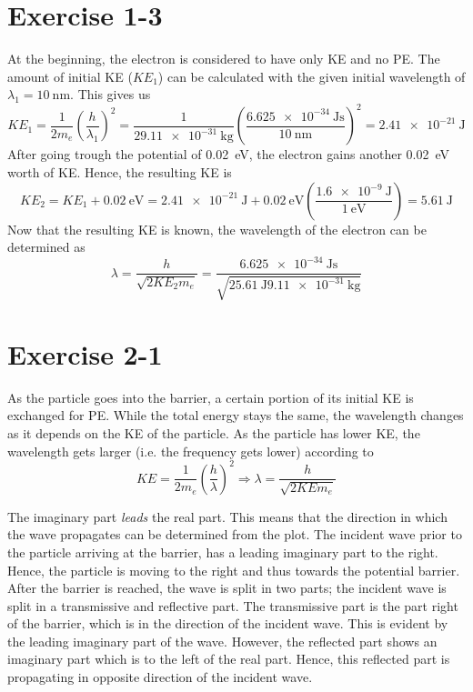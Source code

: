 \section{Exercise 1-3}
At the beginning, the electron is considered to have only KE and no PE. The
amount of initial KE ($KE_1$) can be calculated with the given initial
wavelength of $\lambda_1 = \SI{10}{\nano\meter}$. This gives us
\[
	KE_1
	= \frac{1}{2 m_e} \left(\frac{h}{\lambda_1}\right)^2
	= \frac{1}{2 \SI{9.11e-31}{\kg}} \left(\frac{\SI{6.625e-34}{\joule\second}}{\SI{10}{\nano\meter}}\right)^2
	= \SI{2.41e-21}{\joule}
\]
After going trough the potential of \SI{0.02}{\eV}, the electron gains
another \SI{0.02}{\eV} worth of KE. Hence, the resulting KE is
\[
	KE_2
	= KE_1 + \SI{0.02}{\eV}
	= \SI{2.41e-21}{\joule} + \SI{0.02}{\eV}\left(\frac{\SI{1.6e-9}{\joule}}{\SI{1}{\eV}}\right)
	= \SI{5.61}{\joule}
\]
Now that the resulting KE is known, the wavelength of the electron can be
determined as
\[
	\lambda
	= \frac{h}{\sqrt{2 KE_2 m_e}}
	= \frac{\SI{6.625e-34}{\joule\second}}{\sqrt{2 \SI{5.61}{\joule} \SI{9.11e-31}{\kg}}}
\]



\newpage
\section{Exercise 2-1}
As the particle goes into the barrier, a certain portion of its initial KE
is exchanged for PE. While the total energy stays the same, the wavelength
changes as it depends on the KE of the particle. As the particle has lower
KE, the wavelength gets larger (i.e. the frequency gets lower) according to
\[
	KE = \frac{1}{2 m_e} \left(\frac{h}{\lambda}\right)^2
	\Rightarrow
	\lambda = \frac{h}{\sqrt{2 KE m_e}}
\]

The imaginary part \emph{leads} the real part. This means that the direction
in which the wave propagates can be determined from the plot. The incident
wave prior to the particle arriving at the barrier, has a leading imaginary
part to the right. Hence, the particle is moving to the right and thus
towards the potential barrier. After the barrier is reached, the wave is
split in two parts; the incident wave is split in a transmissive and
reflective part. The transmissive part is the part right of the barrier, which
is in the direction of the incident wave. This is evident by the leading
imaginary part of the wave. However, the reflected part shows an imaginary
part which is to the left of the real part. Hence, this reflected part is
propagating in opposite direction of the incident wave.

